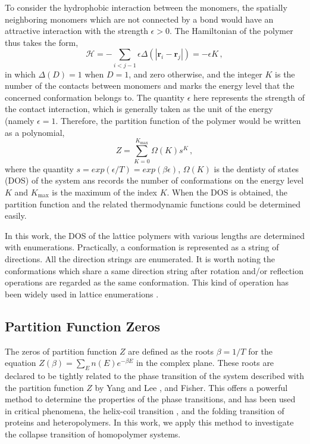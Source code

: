 \documentclass[preprint,preprintnumbers,amsmath,amssymb,showpacs,aps,pre]{revtex4-1}
\begin{document}
To consider the hydrophobic interaction between the monomers, the spatially
neighboring monomers which are not connected by a bond would have an
attractive interaction with the strength $\epsilon>0$. The Hamiltonian of
the polymer thus takes the form,
\begin{equation}
{\mathcal H}=-\sum_{i<j-1}\epsilon \Delta(|{\mathbf r}_i-{\mathbf r}_j|)=
-\epsilon K \, ,
\end{equation}
in which $\Delta(D)=1$ when $D=1$, and zero otherwise, and the integer $K$
is the number of the contacts between monomers and marks the energy level
that the concerned conformation belongs to. The quantity $\epsilon$ here
represents the strength of the contact interaction, which is generally taken
as the unit of the energy (namely $\epsilon=1$. Therefore, the partition
function of the polymer would be written as a polynomial,
\begin{equation}
Z=\sum_{K=0}^{K_{\text{max}}} \Omega(K) s^K \, ,
\end{equation}
where the quantity $s=exp(\epsilon/T)=exp(\beta\epsilon)$, $\Omega(K)$ is
the dentisty of states (DOS) of the system ans records the number 
of conformations on the energy level $K$ and $K_{\text{max}}$ is the
maximum of the index $K$. When the DOS is obtained, the partition function
and the related thermodynamic functions could be determined easily.

In this work, the DOS of the lattice polymers with various lengths are
determined with enumerations. Practically, a conformation is represented
as a string of directions. All the direction strings are enumerated. It is
worth noting the conformations which share a same direction string after
rotation and/or reflection operations are regarded as the same conformation.
This kind of operation has been widely used in lattice enumerations
\cite{CieplakPRL98,PandePRL96}.

\subsection{Partition Function Zeros}

The zeros of partition function $Z$ are defined as the roots $\beta=1/T$
for the equation $Z(\beta)=\sum_E n(E)e^{-\beta E}$ in the complex plane.
These roots are declared to be tightly related to the phase transition
of the system described with the partition function $Z$ by Yang and Lee
\cite{LYPR52}, and Fisher\cite{FisherBook}. This offers a powerful method
to determine the properties of the phase transitions, and has been used
in critical phenomena\cite{LipowskiIJMPB05}, the helix-coil transition
\cite{HansmannPRL00,HansmannPA01}, and the folding transition of
proteins and heteropolymers\cite{WangJCP03,ChenPA05}.
In this work, we apply this method to investigate
the collapse transition of homopolymer systems.
\end{document}
